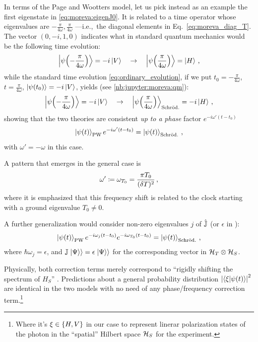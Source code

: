 In terms of the Page and Wootters model,
let us pick instead as an example the first eigenstate in \eqref{eq:moreva:eigenJ0}.
It is related to a time operator whose eigenvalues are
$-\frac{\pi}{4\omega}, \frac{\pi}{4\omega}$
---i.e.,~the diagonal elements in Eq.~\eqref{eq:moreva_diag_T}.
The vector $(0, -i, 1, 0)$ indicates what in standard quantum mechanics would be
the following time evolution:
\begin{equation}
  \ket{\psi\qty(-\frac{\pi}{4\omega})} = -i\ket{V}
  \quad \rightarrow \quad
  \ket{\psi\qty( \frac{\pi}{4\omega})} =   \ket{H}
  \, \text{,}
\end{equation}
while the standard time evolution \eqref{eq:ordinary_evolution}, if we put
$t_0 = -\frac{\pi}{4\omega}$, $t = \frac{\pi}{4\omega}$, $\ket{\psi\qty(t_0)} = -i\ket{V}$,
yields (see \ref{nb:jupyter:moreva:qm}):
\begin{equation}
  \ket{\psi\qty(-\frac{\pi}{4\omega})} = -i\ket{V}
  \quad \rightarrow \quad
  \ket{\psi\qty( \frac{\pi}{4\omega})}_{\mathrm{Schr\ddot{o}d.}} = -i\ket{H}
  \, \text{,}
\end{equation}
showing that the two theories are consistent \emph{up to a phase} factor
$e^{-i\omega'(t - t_{0})}$
\begin{equation}
  \ket{\psi(t)}_{\mathrm{PW}} e^{-i\omega'(t - t_{0})} = \ket{\psi(t)}_{\mathrm{Schr\ddot{o}d.}} \,\text{,}  
\end{equation}
with $\omega' = -\omega$ in this case.

A pattern that emerges in the general case is
\[
  \omega' \coloneqq \omega_{T_{0}} = \frac{\pi T_0}{(\delta T)^2} \,\text{,}
\]
where it is emphasized that this frequency shift is related to the clock starting
with a ground eigenvalue $T_0 \ne 0$.

A further generalization would consider non-zero eigenvalues $j$ of $\hat{\mathbb{J}}$
(or $\epsilon$ in \cite[eq. 16]{Lloyd:Time}):
\begin{equation}\label{eq:pw-vs-qm}
  \ket{\psi(t)}_{\mathrm{PW}} e^{-i\omega_{j}(t - t_{0})} e^{-i\omega_{T_0}(t - t_{0})} = \ket{\psi(t)}_{\mathrm{Schr\ddot{o}d.}} \,\text{,}
\end{equation}
where $\hbar\omega_j = \epsilon$,
and $\mathbb{J}\left.\left| \Psi \right\rangle\right\rangle = \epsilon \left.\left| \Psi \right\rangle\right\rangle$
for the corresponding vector in $\mathcal{H}_T \otimes \mathcal{H}_S$.

Physically, both correction terms merely
correspond to ``rigidly shifting the spectrum of $H_S$'' \parencite{Lloyd:Time}.
Predictions about a general probability distribution
$\abs{\braket{\xi}{\psi(t)}}^2$
are identical in the two models with no need of any phase/frequency correction term.\footnote{
  Where it's $\xi \in \qty{H, V}$
  in our case to represent linerar polarization states of the photon in
  the ``spatial'' Hilbert space $\mathcal{H}_S$
  for the experiment.
}

